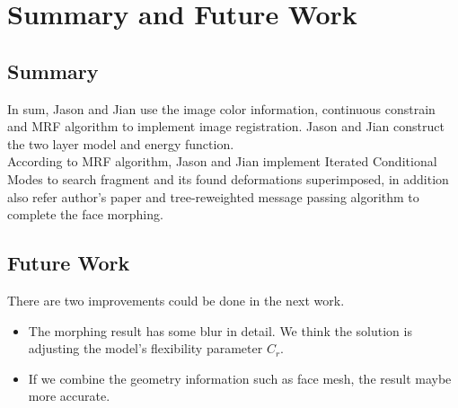 \documentclass{article} %
\begin{document}
\section{Summary and Future Work}
\subsection{Summary}
        In sum, Jason and Jian use the image color information, continuous constrain and MRF algorithm to implement image registration. Jason and Jian construct the two layer model and energy function.\\
        According to MRF algorithm, Jason and Jian implement Iterated Conditional Modes to search fragment and its found deformations superimposed, in addition  also refer author's paper and tree-reweighted message passing algorithm to complete the face morphing. \\


\subsection{Future Work}
	There are two improvements could be done in the next work.
	\begin{itemize}
	  \item
	  The morphing result has some blur in detail. We think the solution is adjusting the model's flexibility parameter $C_{r}$.
	  \item
	  If we combine the geometry information such as face mesh, the result maybe more accurate.
	\end{itemize}
\end{document}

